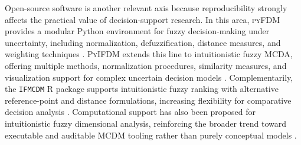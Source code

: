 Open-source software is another relevant axis because reproducibility strongly affects the practical value of decision-support research. In this area, \textsc{pyFDM} provides a modular Python environment for fuzzy decision-making under uncertainty, including normalization, defuzzification, distance measures, and weighting techniques \citep{Wieckowski2022pyFDM}. \textsc{PyIFDM} extends this line to intuitionistic fuzzy MCDA, offering multiple methods, normalization procedures, similarity measures, and visualization support for complex uncertain decision models \citep{Wieckowski2023PyIFDM,Wieckowski2024PyIFDMUpdate}. Complementarily, the \texttt{IFMCDM} R package supports intuitionistic fuzzy ranking with alternative reference-point and distance formulations, increasing flexibility for comparative decision analysis \citep{Roszkowska2024IFMCDM}. Computational support has also been proposed for intuitionistic fuzzy dimensional analysis, reinforcing the broader trend toward executable and auditable MCDM tooling rather than purely conceptual models \citep{PerezDominguez2024IFDA}.

